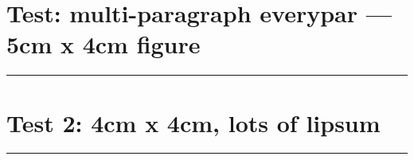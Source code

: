 \documentclass[a4paper,11pt]{article}
\begin{document}
\section*{Test: multi-paragraph everypar — 5cm x 4cm figure}
\begin{swarmwrap}%
  \begin{minipage}[t]{4cm}
    \centering
    \rule{\linewidth}{4cm}
  \end{minipage}%
\end{swarmwrap}%
\swarmwrapnext
\lipsum[1]\lipsum[2]\lipsum[3]
\newpage
\section*{Test 2: 4cm x 4cm, lots of lipsum}
\begin{swarmwrap}%
  \begin{minipage}[t]{4cm}
    \centering
    \rule{\linewidth}{4cm}
  \end{minipage}%
\end{swarmwrap}%
\swarmwrapnext
\lipsum[4]\lipsum[5]\lipsum[6]\lipsum[7]\lipsum[8]
\end{document}
